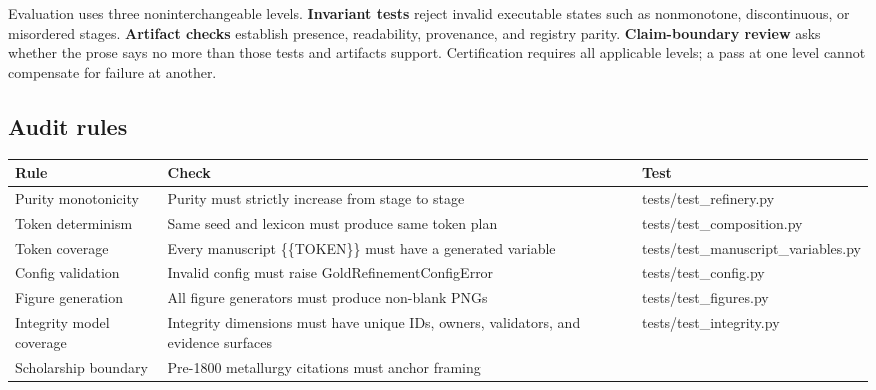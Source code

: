 \documentclass[
  english,
]{article}
\newcounter{none} %
\begin{document}
Evaluation uses three noninterchangeable levels. \textbf{Invariant
tests} reject invalid executable states such as nonmonotone,
discontinuous, or misordered stages. \textbf{Artifact checks} establish
presence, readability, provenance, and registry parity.
\textbf{Claim-boundary review} asks whether the prose says no more than
those tests and artifacts support. Certification requires all applicable
levels; a pass at one level cannot compensate for failure at another.

\subsection{Audit rules}\label{audit-rules}

{\def\LTcaptype{none} %
\begin{longtable}[]{@{}
  >{\raggedright\arraybackslash}p{}
  >{\raggedright\arraybackslash}p{}
  >{\raggedright\arraybackslash}p{}@{}}
\toprule\noalign{}
\begin{minipage}[b]{\linewidth}\raggedright
Rule
\end{minipage} & \begin{minipage}[b]{\linewidth}\raggedright
Check
\end{minipage} & \begin{minipage}[b]{\linewidth}\raggedright
Test
\end{minipage} \\
\midrule\noalign{}
\endhead
\bottomrule\noalign{}
\endlastfoot
Purity monotonicity & Purity must strictly increase from stage to stage
& tests/test\_refinery.py \\
Token determinism & Same seed and lexicon must produce same token plan &
tests/test\_composition.py \\
Token coverage & Every manuscript \{\{TOKEN\}\} must have a generated
variable & tests/test\_manuscript\_variables.py \\
Config validation & Invalid config must raise GoldRefinementConfigError
& tests/test\_config.py \\
Figure generation & All figure generators must produce non-blank PNGs &
tests/test\_figures.py \\
Integrity model coverage & Integrity dimensions must have unique IDs,
owners, validators, and evidence surfaces & tests/test\_integrity.py \\
Scholarship boundary & Pre-1800 metallurgy citations must anchor framing

\end{longtable}}
\end{document}
